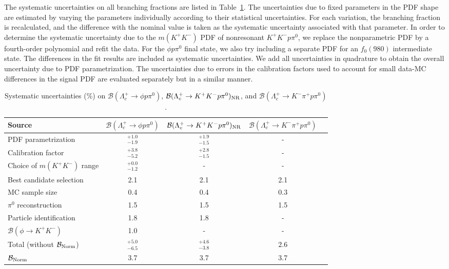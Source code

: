 \documentclass[aps,prl,twocolumn,superscriptaddress,showpacs,preprintnumbers,amsmath,amssymb]{revtex4-1}
\begin{document}
The systematic uncertainties on all branching fractions are listed in Table~\ref{sys1}. The uncertainties due to fixed parameters in the PDF shape are estimated by varying the parameters individually according to their statistical uncertainties. For each variation, the branching fraction is recalculated, and the difference with the nominal value is taken as the systematic uncertainty associated with that parameter. In order to determine the systematic uncertainty due to the $m(K^+K^-)$ PDF of nonresonant $K^+K^-p\pi^0$, we  replace the nonparametric PDF by a fourth-order polynomial  and refit the data.  For the $\phi p\pi^0$ final state, we also try including a separate PDF for an $f_0(980)$ intermediate state. The differences in the fit results are included as systematic uncertainties. We add  all uncertainties in quadrature to obtain the overall uncertainty due to PDF parametrization. The uncertainties due to errors in the calibration factors used to account for small data-MC differences in the signal PDF are evaluated separately but in a similar manner. 
\begin{table*}[h!tb]
\renewcommand{\arraystretch}{1.2}
\caption{\small Systematic uncertainties (\%) on $\mathcal{B}(\Lambda_c^+\to \phi p\pi^0)$, $\mathcal{B}(\Lambda_c^+\to K^+K^-p\pi^0)_{\rm NR}$, and $\mathcal{B}(\Lambda_c^+\to K^-\pi^+p\pi^0)$.}
\label{sys1}
\centering
\begin{tabular}{l|cccc}
\hline \hline
Source & $\mathcal{B}(\Lambda_c^+\to \phi p\pi^0)$ & $\mathcal{B}(\Lambda_c^+\to K^+K^-p\pi^0)_{\rm NR}$ & $\mathcal{B}(\Lambda_c^+\to K^-\pi^+p\pi^0)$  \\
\hline
PDF parametrization & $^{+1.0}_{-1.9}$ & $^{+1.9}_{-1.5}$&- \\
Calibration factor &$^{+3.8}_{-5.2}$  & $^{+2.8}_{-1.5}$&-\\
Choice of $m(K^+K^-)$ range & $^{+0.0}_{-1.2}$ &- &-\\
Best candidate selection &2.1 & 2.1 & 2.1  \\
MC sample size &  0.4 & 0.4 & 0.3 \\
$\pi^0$ reconstruction & 1.5 & 1.5 & 1.5 \\
Particle identification & 1.8 & 1.8 & - \\
$\mathcal{B}(\phi\to K^+K^-)$ & 1.0 & - & - \\
\hline
Total (without $\mathcal{B}_{\rm Norm}$) & $^{+5.0}_{-6.5}$ &$^{+4.6}_{-3.8}$ &$2.6$\\
\hline
$\mathcal{B}_{\rm Norm}$ & 3.7 &  3.7 &  3.7 \\
\hline\hline
\end{tabular}
\end{table*}
\end{document}
